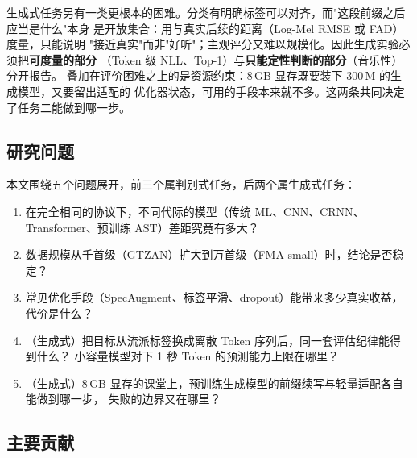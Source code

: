 \documentclass[UTF8,10pt,a4paper]{ctexart}
\begin{document}
生成式任务另有一类更根本的困难。分类有明确标签可以对齐，而"这段前缀之后应当是什么"本身
是开放集合：用与真实后续的距离（Log-Mel RMSE 或 FAD\cite{kilgour2019fad}）度量，只能说明
"接近真实"而非"好听"；主观评分又难以规模化。因此生成实验必须把\textbf{可度量的部分}
（Token 级 NLL、Top-1）与\textbf{只能定性判断的部分}（音乐性）分开报告。
叠加在评价困难之上的是资源约束：8\,GB 显存既要装下 300\,M 的生成模型，又要留出适配的
优化器状态，可用的手段本来就不多。这两条共同决定了任务二能做到哪一步。

\subsection{研究问题}

本文围绕五个问题展开，前三个属判别式任务，后两个属生成式任务：
\begin{enumerate}
  \item 在完全相同的协议下，不同代际的模型（传统 ML、CNN、CRNN、Transformer、预训练 AST）差距究竟有多大？
  \item 数据规模从千首级（GTZAN）扩大到万首级（FMA-small）时，结论是否稳定？
  \item 常见优化手段（SpecAugment、标签平滑、dropout）能带来多少真实收益，代价是什么？
  \item （生成式）把目标从流派标签换成离散 Token 序列后，同一套评估纪律能得到什么？
        小容量模型对下 1 秒 Token 的预测能力上限在哪里？
  \item （生成式）8\,GB 显存的课堂上，预训练生成模型的前缀续写与轻量适配各自能做到哪一步，
        失败的边界又在哪里？
\end{enumerate}

\subsection{主要贡献}
\end{document}
